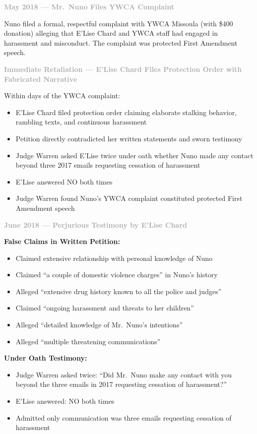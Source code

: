 \documentclass[11pt, letterpaper]{article}
\newcommand{\subsubsectiontitle}[1]{\vspace{0.1in}\noindent\textcolor{DarkGray}{\textbf{#1}}\vspace{0.05in}}
\begin{document}
\subsubsectiontitle{May 2018 --- Mr.\ Nuno Files YWCA Complaint}

Nuno filed a formal, respectful complaint with YWCA Missoula (with \$400 donation) alleging that E'Lise Chard and YWCA staff had engaged in harassment and misconduct. The complaint was protected First Amendment speech.

\subsubsectiontitle{Immediate Retaliation --- E'Lise Chard Files Protection Order with Fabricated Narrative}

Within days of the YWCA complaint:
\begin{itemize}[leftmargin=*,itemsep=2pt]
    \item E'Lise Chard filed protection order claiming elaborate stalking behavior, rambling texts, and continuous harassment
    \item Petition directly contradicted her written statements and sworn testimony
    \item Judge Warren asked E'Lise twice under oath whether Nuno made any contact beyond three 2017 emails requesting cessation of harassment
    \item E'Lise answered NO both times
    \item Judge Warren found Nuno's YWCA complaint constituted protected First Amendment speech
\end{itemize}

\subsubsectiontitle{June 2018 --- Perjurious Testimony by E'Lise Chard}

\textbf{False Claims in Written Petition:}
\begin{itemize}[leftmargin=*,itemsep=2pt]
    \item Claimed extensive relationship with personal knowledge of Nuno
    \item Claimed ``a couple of domestic violence charges'' in Nuno's history
    \item Alleged ``extensive drug history known to all the police and judges''
    \item Claimed ``ongoing harassment and threats to her children''
    \item Alleged ``detailed knowledge of Mr.\ Nuno's intentions''
    \item Alleged ``multiple threatening communications''
\end{itemize}

\textbf{Under Oath Testimony:}
\begin{itemize}[leftmargin=*,itemsep=2pt]
    \item Judge Warren asked twice: ``Did Mr.\ Nuno make any contact with you beyond the three emails in 2017 requesting cessation of harassment?''
    \item E'Lise answered: NO both times
    \item Admitted only communication was three emails requesting cessation of harassment
\end{itemize}
\end{document}
